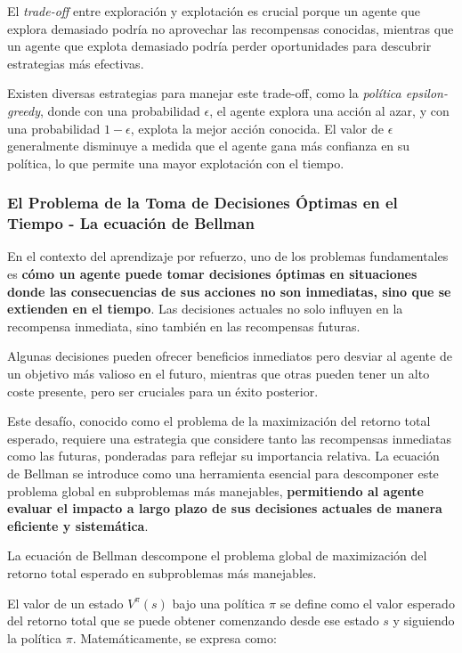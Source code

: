 \documentclass[a4paper,12pt, twoside]{report}
\begin{document}
El \textit{trade-off} entre exploración y explotación es crucial porque un agente que explora 
demasiado podría no aprovechar las recompensas conocidas, mientras que un agente que explota 
demasiado podría perder oportunidades para descubrir estrategias más efectivas. 

Existen diversas estrategias para manejar este trade-off, como la \textit{política epsilon-greedy}, 
donde con una probabilidad \(\epsilon\), el agente explora una acción al azar, y con 
una probabilidad \(1-\epsilon\), explota la mejor acción conocida. El valor de \(\epsilon\) 
generalmente disminuye a medida que el agente gana más confianza en su política, lo que permite 
una mayor explotación con el tiempo.


\subsubsection{El Problema de la Toma de Decisiones Óptimas en el Tiempo - La ecuación de Bellman}


En el contexto del aprendizaje por refuerzo, uno de los problemas fundamentales es 
\textbf{cómo un agente puede tomar decisiones óptimas en situaciones donde las consecuencias de 
sus acciones no son inmediatas, sino que se extienden en el tiempo}. Las decisiones actuales no 
solo influyen en la recompensa inmediata, sino también en las recompensas futuras. 

Algunas decisiones pueden ofrecer beneficios inmediatos pero desviar al agente de un objetivo 
más valioso en el futuro, mientras que otras pueden tener un alto coste presente, pero ser 
cruciales para un éxito posterior.

Este desafío, conocido como el problema de la maximización del retorno total esperado, 
requiere una estrategia que considere tanto las recompensas inmediatas como las futuras, 
ponderadas para reflejar su importancia relativa. La ecuación de Bellman se introduce como 
una herramienta esencial para descomponer este problema global en subproblemas más manejables, 
\textbf{permitiendo al agente evaluar el impacto a largo plazo de sus decisiones actuales de 
manera eficiente y sistemática}.

La ecuación de Bellman descompone el problema global de maximización del retorno total 
esperado en subproblemas más manejables. 

El valor de un estado \(V^\pi(s)\) bajo una política \(\pi\) se define como el valor esperado 
del retorno total que se puede obtener comenzando desde ese estado \(s\) y siguiendo la política 
\(\pi\). Matemáticamente, se expresa como:
\end{document}

